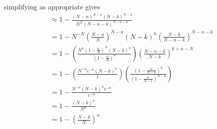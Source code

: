 \documentclass{article}
\theoremstyle{definition}
\begin{document}
simplifying as appropriate gives
\begin{align}
    & \approx 1- \frac{\left(N-n\right)^{N-n}\left(N-k\right)^{N-k}}{N^{N}\left(N-n-k\right)^{N-n-k}}\\
    &= 1- N^{-N}\left(\frac{N-n}{N}\right)^{N-n}\left(N-k\right)^{n}\left(\frac{N-k}{N-n-k}\right)^{N-n-k}\\
    &=1-\left(\frac{N^{n}\left(1-\frac{n}{N}\right)^{N}\left(N-k\right)^{n}}{\left(1-\frac{n}{N}\right)^{n}}\right)\left(\frac{N-n-k}{N-k}\right)^{k+n-N}\\
    &=1-\left(\frac{N^{-n}e^{-n}\left(N-k\right)^{n}}{1}\right)\left(\frac{\left(1-\frac{n}{N-k}\right)^{n}}{\left(1-\frac{n}{N-k}\right)^{N-k}}\right)\\
    &=1-\frac{N^{-n}\left(N-k\right)^{n}e^{-n}}{e^{-n}}\\
    &=1-\frac{\left(N-k\right)^{n}}{N^{n}}\\
    &=1-\left(\frac{N-k}{N}\right)^{n}
\end{align}
\end{document}
